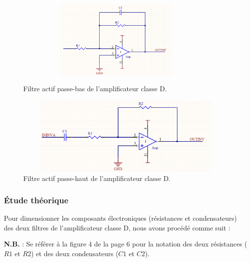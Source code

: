\documentclass[10pt, oneside, a4paper]{article}
\begin{document}
\begin{figure}[htbp]
    \centering
    \begin{minipage}[c]{.46\linewidth}
        \includegraphics[height=110pt, width=0.9\textwidth]{eps/Filtre_passe_bas.jpg}
        \caption{Filtre actif passe-bas de l'amplificateur classe D.}   
    \end{minipage} \hfill
    \begin{minipage}[c]{.46\linewidth}
        \includegraphics[height=110pt, width=1.1\textwidth]{eps/Filtre_passe_haut.jpg}
        \caption{Filtre actif passe-haut de l'amplificateur classe D.}    
    \end{minipage}
\end{figure}

\subsubsection{Étude théorique}\label{sec:etudeTheorique}
Pour dimensionner les composants électroniques (résistances et condensateurs) des deux filtres de l'amplificateur classe D, nous avons procédé comme suit : 

\textbf{N.B.} : Se référer à la figure 4 de la page 6 pour la notation des deux résistances ($R1$ et $R2$) et des deux condensateurs ($C1$ et $C2$).
\end{document}
